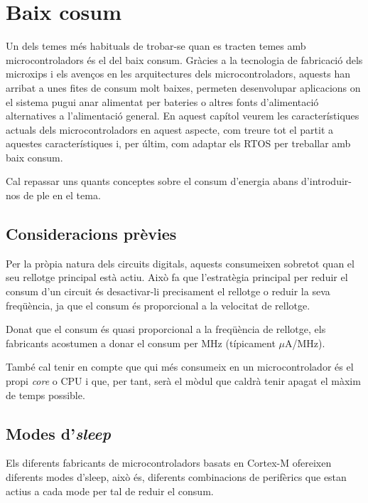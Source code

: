 \chapter{Baix cosum}
\label{ch:low-power}
Un dels temes més habituals de trobar-se quan es tracten temes amb microcontroladors és el del baix consum. Gràcies a la tecnologia de fabricació dels microxips i els avenços en les arquitectures dels microcontroladors, aquests han arribat a unes fites de consum molt baixes, permeten desenvolupar aplicacions on el sistema pugui anar alimentat per bateries o altres fonts d'alimentació alternatives a l'alimentació general. En aquest capítol veurem les característiques actuals dels microcontroladors en aquest aspecte, com treure tot el partit a aquestes característiques i, per últim, com adaptar els \gls{RTOS} per treballar amb baix consum.

Cal repassar uns quants conceptes sobre el consum d'energia abans d'introduir-nos de ple en el tema.

\section{Consideracions prèvies}
\label{sec:lowpowerintro}

Per la pròpia natura dels circuits digitals, aquests consumeixen sobretot quan el seu rellotge principal està actiu. Això fa que l'estratègia principal per reduir el consum d'un circuit és desactivar-li precisament el rellotge o reduir la seva freqüència, ja que el consum és proporcional a la velocitat de rellotge.
\begin{remark}
 Donat que el consum és quasi proporcional a la freqüència de rellotge, els fabricants acostumen a donar el consum per MHz (típicament $\mu$A/MHz).
\end{remark}

També cal tenir en compte que qui més consumeix en un microcontrolador és el propi {\em core} o CPU i que, per tant, serà el mòdul que caldrà tenir apagat el màxim de temps possible.

\section{Modes d'{\em sleep}}
\label{sec:sleepmodes}
Els diferents fabricants de microcontroladors basats en Cortex-M ofereixen diferents modes d'sleep, això és, diferents combinacions de perifèrics que estan actius a cada mode per tal de reduir el consum.

